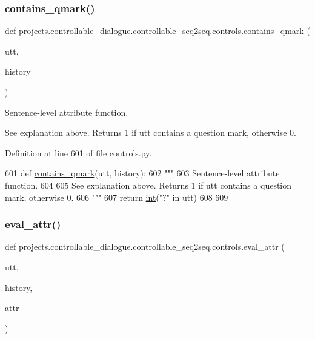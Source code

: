 \subsubsection{\texorpdfstring{contains\+\_\+qmark()}{contains\_qmark()}}
{\footnotesize\ttfamily def projects.\+controllable\+\_\+dialogue.\+controllable\+\_\+seq2seq.\+controls.\+contains\+\_\+qmark (\begin{DoxyParamCaption}\item[{}]{utt,  }\item[{}]{history }\end{DoxyParamCaption})}

\begin{DoxyVerb}Sentence-level attribute function.

See explanation above. Returns 1 if utt contains a question mark, otherwise 0.
\end{DoxyVerb}
 

Definition at line 601 of file controls.\+py.


\begin{DoxyCode}
601 \textcolor{keyword}{def }\hyperlink{namespaceprojects_1_1controllable__dialogue_1_1controllable__seq2seq_1_1controls_a9ff7f284ebe0c571ce6335d4aab2bb36}{contains\_qmark}(utt, history):
602     \textcolor{stringliteral}{"""}
603 \textcolor{stringliteral}{    Sentence-level attribute function.}
604 \textcolor{stringliteral}{}
605 \textcolor{stringliteral}{    See explanation above. Returns 1 if utt contains a question mark, otherwise 0.}
606 \textcolor{stringliteral}{    """}
607     \textcolor{keywordflow}{return} \hyperlink{namespacelanguage__model_1_1eval__ppl_a7d12ee00479673c5c8d1f6d01faa272a}{int}(\textcolor{stringliteral}{"?"} \textcolor{keywordflow}{in} utt)
608 
609 
\end{DoxyCode}
\mbox{\label{namespaceprojects_1_1controllable__dialogue_1_1controllable__seq2seq_1_1controls_afc2b447cbf1dcb4a754d080d2e611c24}} 
\subsubsection{\texorpdfstring{eval\+\_\+attr()}{eval\_attr()}}
{\footnotesize\ttfamily def projects.\+controllable\+\_\+dialogue.\+controllable\+\_\+seq2seq.\+controls.\+eval\+\_\+attr (\begin{DoxyParamCaption}\item[{}]{utt,  }\item[{}]{history,  }\item[{}]{attr }\end{DoxyParamCaption})}

